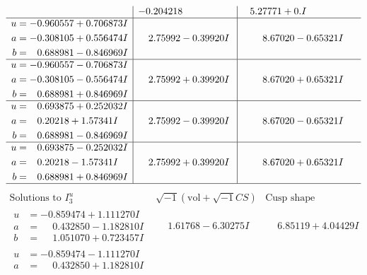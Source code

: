 \documentclass[1p]{elsarticle_modified}
\theoremstyle{definition}
\newcommand{\I}{\sqrt{-1}}
\begin{document}
$$\begin{array}{c|c|c}
 & -0.204218\phantom{ +0.000000I} & \phantom{-}5.27771 + 0. I\phantom{ +0.000000I} \\ \hline\begin{aligned}
u &= -0.960557 + 0.706873 I \\
a &= -0.308105 + 0.556474 I \\
b &= \phantom{-}0.688981 - 0.846969 I\end{aligned}
 & \phantom{-}2.75992 - 0.39920 I & \phantom{-}8.67020 - 0.65321 I \\ \hline\begin{aligned}
u &= -0.960557 - 0.706873 I \\
a &= -0.308105 - 0.556474 I \\
b &= \phantom{-}0.688981 + 0.846969 I\end{aligned}
 & \phantom{-}2.75992 + 0.39920 I & \phantom{-}8.67020 + 0.65321 I \\ \hline\begin{aligned}
u &= \phantom{-}0.693875 + 0.252032 I \\
a &= \phantom{-}0.20218 + 1.57341 I \\
b &= \phantom{-}0.688981 - 0.846969 I\end{aligned}
 & \phantom{-}2.75992 - 0.39920 I & \phantom{-}8.67020 - 0.65321 I \\ \hline\begin{aligned}
u &= \phantom{-}0.693875 - 0.252032 I \\
a &= \phantom{-}0.20218 - 1.57341 I \\
b &= \phantom{-}0.688981 + 0.846969 I\end{aligned}
 & \phantom{-}2.75992 + 0.39920 I & \phantom{-}8.67020 + 0.65321 I\\
 \hline 
 \end{array}$$\newpage$$\begin{array}{c|c|c}  
\text{Solutions to }I^u_{3}& \I (\text{vol} + \sqrt{-1}CS) & \text{Cusp shape}\\
 \hline 
\begin{aligned}
u &= -0.859474 + 1.111270 I \\
a &= \phantom{-}0.432850 - 1.182810 I \\
b &= \phantom{-}1.051070 + 0.723457 I\end{aligned}
 & \phantom{-}1.61768 - 6.30275 I & \phantom{-}6.85119 + 4.04429 I \\ \hline\begin{aligned}
u &= -0.859474 - 1.111270 I \\
a &= \phantom{-}0.432850 + 1.182810 I \\

\end{aligned}
\end{array}$$
\end{document}
